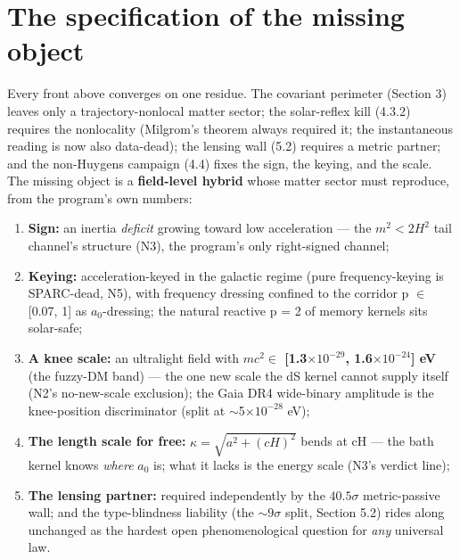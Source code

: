 \documentclass[11pt,a4paper]{article}
\begin{document}
\section{The specification of the missing object}

Every front above converges on one residue. The covariant perimeter (Section 3) leaves only a trajectory-nonlocal matter sector; the solar-reflex kill (4.3.2) requires the nonlocality (Milgrom's theorem always required it; the instantaneous reading is now also data-dead); the lensing wall (5.2) requires a metric partner; and the non-Huygens campaign (4.4) fixes the sign, the keying, and the scale. The missing object is a \textbf{field-level hybrid} whose matter sector must reproduce, from the program's own numbers:

\begin{enumerate}
\item \textbf{Sign:} an inertia \emph{deficit} growing toward low acceleration --- the $m^2 < 2H^2$ tail channel's structure (N3), the program's only right-signed channel;

\item \textbf{Keying:} acceleration-keyed in the galactic regime (pure frequency-keying is SPARC-dead, N5), with frequency dressing confined to the corridor p $\in$ [0.07, 1] as $a_{0}$-dressing; the natural reactive p = 2 of memory kernels sits solar-safe;

\item \textbf{A knee scale:} an ultralight field with \textbf{$mc^2 \in$ [1.3$\times10^{-29}$, 1.6$\times10^{-24}$] eV} (the fuzzy-DM band) --- the one new scale the dS kernel cannot supply itself (N2's no-new-scale exclusion); the Gaia DR4 wide-binary amplitude is the knee-position discriminator (split at $\sim$5$\times10^{-28}$ eV);

\item \textbf{The length scale for free:} $\kappa = \sqrt{a^2 + (cH)^2}$ bends at cH --- the bath kernel knows \emph{where} $a_{0}$ is; what it lacks is the energy scale (N3's verdict line);

\item \textbf{The lensing partner:} required independently by the $40.5\sigma$ metric-passive wall; and the type-blindness liability (the $\sim{}9\sigma$ split, Section 5.2) rides along unchanged as the hardest open phenomenological question for \emph{any} universal law.

\end{enumerate}
\end{document}
